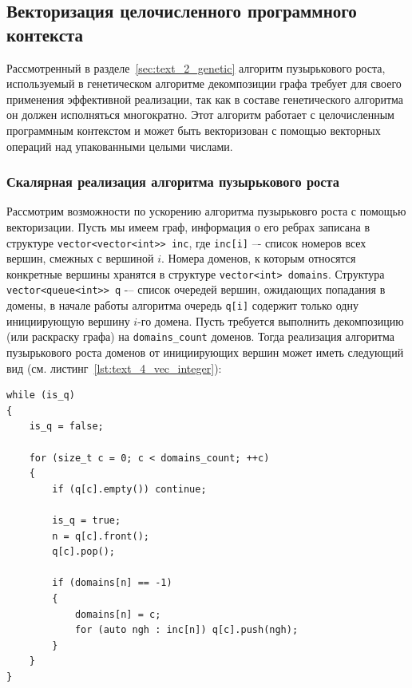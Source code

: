 \subsection{Векторизация целочисленного программного контекста}

Рассмотренный в разделе~\ref{sec:text_2_genetic} алгоритм пузырькового роста, используемый в генетическом алгоритме декомпозиции графа требует для своего применения эффективной реализации, так как в составе генетического алгоритма он должен исполняться многократно.
Этот алгоритм работает с целочисленным программным контекстом и может быть векторизован с помощью векторных операций над упакованными целыми числами.

\subsubsection{Скалярная реализация алгоритма пузырькового роста}

Рассмотрим возможности по ускорению алгоритма пузырьковго роста с помощью векторизации.
Пусть мы имеем граф, информация о его ребрах записана в структуре \texttt{vector<vector<int>> inc}, где \texttt{inc[i]} –- список номеров всех вершин, смежных с вершиной $i$.
Номера доменов, к которым относятся конкретные вершины хранятся в структуре \texttt{vector<int> domains}.
Структура \texttt{vector<queue<int>> q} -– список очередей вершин, ожидающих попадания в домены, в начале работы алгоритма очередь \texttt{q[i]} содержит только одну инициирующую вершину $i$-го домена.
Пусть требуется выполнить декомпозицию (или раскраску графа) на \texttt{domains\_count} доменов.
Тогда реализация алгоритма пузырькового роста доменов от инициирующих вершин может иметь следующий вид (см. листинг~\ref{lst:text_4_vec_integer}):

\begin{lstlisting}[caption={Реализация алгоритма пузырькового роста доменов.},label={lst:text_4_vec_integer}]
while (is_q)
{
    is_q = false;

    for (size_t c = 0; c < domains_count; ++c)
    {
        if (q[c].empty()) continue;

        is_q = true;
        n = q[c].front();
        q[c].pop();

        if (domains[n] == -1)
        {
            domains[n] = c;
            for (auto ngh : inc[n]) q[c].push(ngh);
        }
    }
}
\end{lstlisting}

